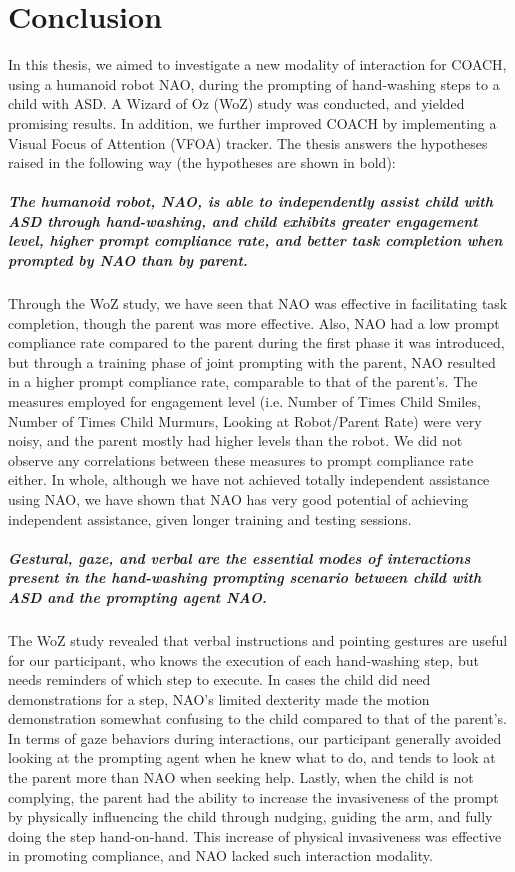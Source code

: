 \chapter{Conclusion}
In this thesis, we aimed to investigate a new modality of interaction for COACH, using a humanoid robot NAO, during the prompting of hand-washing steps to a child with ASD.  A Wizard of Oz (WoZ) study was conducted, and yielded promising results.  In addition, we further improved COACH by implementing a Visual Focus of Attention (VFOA) tracker.  The thesis answers the hypotheses raised in the following way (the hypotheses are shown in bold):

\paragraph{The humanoid robot, NAO, is able to independently assist child with ASD through hand-washing, and child exhibits greater engagement level, higher prompt compliance rate, and better task completion when prompted by NAO than by parent.}
Through the WoZ study, we have seen that NAO was effective in facilitating task completion, though the parent was more effective.  Also, NAO had a low prompt compliance rate compared to the parent during the first phase it was introduced, but through a training phase of joint prompting with the parent, NAO resulted in a higher prompt compliance rate, comparable to that of the parent's.  The measures employed for engagement level (i.e. Number of Times Child Smiles, Number of Times Child Murmurs, Looking at Robot/Parent Rate) were very noisy, and the parent mostly had higher levels than the robot.  We did not observe any correlations between these measures to prompt compliance rate either.  In whole, although we have not achieved totally independent assistance using NAO, we have shown that NAO has very good potential of achieving independent assistance, given longer training and testing sessions.

\paragraph{Gestural, gaze, and verbal are the essential modes of interactions present in the hand-washing prompting scenario between child with ASD and the prompting agent NAO.}
The WoZ study revealed that verbal instructions and pointing gestures are useful for our participant, who knows the execution of each hand-washing step, but needs reminders of which step to execute.  In cases the child did need demonstrations for a step, NAO's limited dexterity made the motion demonstration somewhat confusing to the child compared to that of the parent's.  In terms of gaze behaviors during interactions, our participant generally avoided looking at the prompting agent when he knew what to do, and tends to look at the parent more than NAO when seeking help.  Lastly, when the child is not complying, the parent had the ability to increase the invasiveness of the prompt by physically influencing the child through nudging, guiding the arm, and fully doing the step hand-on-hand.  This increase of physical invasiveness was effective in promoting compliance, and NAO lacked such interaction modality.

